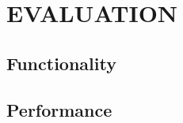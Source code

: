 



\section{\uppercase{Evaluation}}
\label{sec:evaluation}
\noindent

\subsection{Functionality}
\label{sec:evaluation:funtionality}


\subsection{Performance}
\label{sec:evaluation:performance}
